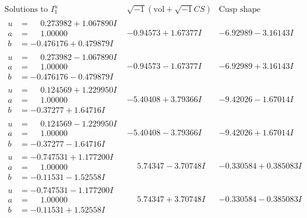 \documentclass[1p]{elsarticle_modified}
\theoremstyle{definition}
\newcommand{\I}{\sqrt{-1}}
\begin{document}
$$\begin{array}{c|c|c}  
\text{Solutions to }I^u_{1}& \I (\text{vol} + \sqrt{-1}CS) & \text{Cusp shape}\\
 \hline 
\begin{aligned}
u &= \phantom{-}0.273982 + 1.067890 I \\
a &= \phantom{-}1.00000\phantom{ +0.000000I} \\
b &= -0.476176 + 0.479879 I\end{aligned}
 & -0.94573 + 1.67377 I & -6.92989 - 3.16143 I \\ \hline\begin{aligned}
u &= \phantom{-}0.273982 - 1.067890 I \\
a &= \phantom{-}1.00000\phantom{ +0.000000I} \\
b &= -0.476176 - 0.479879 I\end{aligned}
 & -0.94573 - 1.67377 I & -6.92989 + 3.16143 I \\ \hline\begin{aligned}
u &= \phantom{-}0.124569 + 1.229950 I \\
a &= \phantom{-}1.00000\phantom{ +0.000000I} \\
b &= -0.37277 + 1.64716 I\end{aligned}
 & -5.40408 + 3.79366 I & -9.42026 - 1.67014 I \\ \hline\begin{aligned}
u &= \phantom{-}0.124569 - 1.229950 I \\
a &= \phantom{-}1.00000\phantom{ +0.000000I} \\
b &= -0.37277 - 1.64716 I\end{aligned}
 & -5.40408 - 3.79366 I & -9.42026 + 1.67014 I \\ \hline\begin{aligned}
u &= -0.747531 + 1.177200 I \\
a &= \phantom{-}1.00000\phantom{ +0.000000I} \\
b &= -0.11531 - 1.52558 I\end{aligned}
 & \phantom{-}5.74347 - 3.70748 I & -0.330584 + 0.385083 I \\ \hline\begin{aligned}
u &= -0.747531 - 1.177200 I \\
a &= \phantom{-}1.00000\phantom{ +0.000000I} \\
b &= -0.11531 + 1.52558 I\end{aligned}
 & \phantom{-}5.74347 + 3.70748 I & -0.330584 - 0.385083 I \\ \hline\begin{aligned}

\end{aligned}
\end{array}$$
\end{document}
